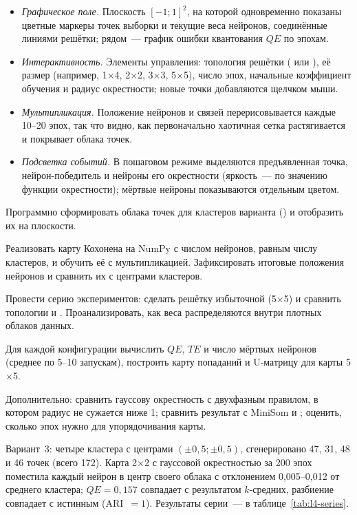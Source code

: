 \begin{itemize}
\item \emph{Графическое поле.} Плоскость $[-1; 1]^2$, на которой одновременно показаны цветные маркеры точек выборки и текущие веса нейронов, соединённые линиями решётки; рядом~--- график ошибки квантования $QE$ по эпохам.
\item \emph{Интерактивность.} Элементы управления: топология решётки ( или ), её размер (например, 1$\times$4, 2$\times$2, 3$\times$3, 5$\times$5), число эпох, начальные коэффициент обучения и радиус окрестности; новые точки добавляются щелчком мыши.
\item \emph{Мультипликация.} Положение нейронов и связей перерисовывается каждые 10--20 эпох, так что видно, как первоначально хаотичная сетка растягивается и покрывает облака точек.
\item \emph{Подсветка событий.} В пошаговом режиме выделяются предъявленная точка, нейрон-победитель и нейроны его окрестности (яркость~--- по значению функции окрестности); мёртвые нейроны показываются отдельным цветом.
\end{itemize}

\begin{steps}
\item Программно сформировать облака точек для кластеров варианта ()
и отобразить их на плоскости.
\item Реализовать карту Кохонена на NumPy с числом нейронов, равным числу кластеров, и обучить её с
мультипликацией. Зафиксировать итоговые положения нейронов и сравнить их с центрами кластеров.
\item Провести серию экспериментов: сделать решётку избыточной (5$\times$5) и сравнить топологии
 и . Проанализировать, как веса распределяются внутри плотных облаков данных.
\item Для каждой конфигурации вычислить $QE$, $TE$ и число мёртвых нейронов (среднее по 5--10 запускам),
построить карту попаданий и U-матрицу для карты 5$\times$5.
\item Дополнительно: сравнить гауссову окрестность с двухфазным правилом, в котором радиус не сужается
ниже 1; сравнить результат с MiniSom и ; оценить, сколько эпох нужно для упорядочивания
карты.
\end{steps}

Вариант~3: четыре кластера с центрами $(\pm 0,5; \pm 0,5)$, сгенерировано 47, 31, 48 и 46 точек (всего
172). Карта 2$\times$2  с гауссовой окрестностью за 200 эпох поместила каждый нейрон в центр
своего облака с отклонением 0,005--0,012 от среднего кластера; $QE = 0,157$ совпадает с результатом
$k$-средних, разбиение совпадает с истинным (ARI~$= 1$). Результаты серии~--- в таблице~\ref{tab:l4-series}.

